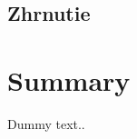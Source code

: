 %
%
{
	\subsection{Zhrnutie}
}
{
	\section{Summary}
}
\label{subsection:system_summary}
Dummy text..